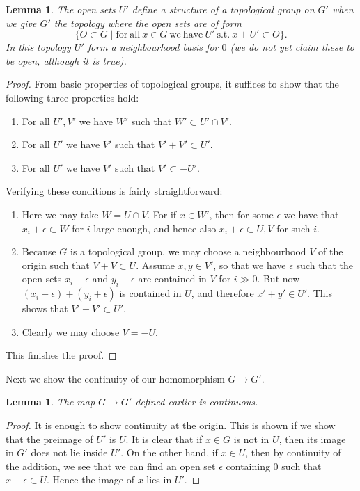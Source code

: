 \documentclass[12pt,a4paper,leqno]{article}
\theoremstyle{plain}
\newtheorem{lem}[theo]{Lemma}
\theoremstyle{definition}
\theoremstyle{remark}
\begin{document}
\begin{lem}\label{TopGroupFromNbhd}
The open sets $U'$ define a structure of a topological group on $G'$ when we give $G'$ the topology where the open sets are of form
\begin{equation*}
\{O \subset G \mid \mathrm{for \ all \ } x \in G \mathrm{\ we \ have \ } U' \mathrm{\ s.t. \ } x+U' \subset O \}.
\end{equation*}
In this topology $U'$ form a neighbourhood basis for $0$ (we do not yet claim these to be open, although it is true).
\end{lem}
\begin{proof}
From basic properties of topological groups, it suffices to show that the following three properties hold:
\begin{enumerate}
\item For all $U',V'$ we have $W'$ such that $W' \subset U' \cap V'$.
\item For all $U'$ we have $V'$ such that $V'+V' \subset U'$.
\item For all $U'$ we have $V'$ such that $V' \subset -U'$.
\end{enumerate}
Verifying these conditions is fairly straightforward:

\begin{enumerate}
\item Here we may take $W = U \cap V$. For if $x \in W'$, then for some $\epsilon$ we have that $x_i + \epsilon \subset W$ for $i$ large enough, and hence also $x_i + \epsilon \subset U,V$ for such $i$.

\item Because $G$ is a topological group, we may choose a neighbourhood $V$ of the origin such that $V+V \subset U$. Assume $x,y \in V'$, so that we have $\epsilon$ such that the open sets $x_i + \epsilon$ and $y_i + \epsilon$ are contained in $V$ for $i \gg 0$. But now $(x_i + \epsilon) + (y_i + \epsilon)$ is contained in $U$, and therefore $x' + y' \in U'$. This shows that $V'+V' \subset U'$.

\item Clearly we may choose $V = -U$. 
\end{enumerate}
This finishes the proof.
\end{proof}

Next we show the continuity of our homomorphism $G \to G'$.

\begin{lem}\label{SeqCont}
The map $G \to G'$ defined earlier is continuous.
\end{lem}
\begin{proof}
It is enough to show continuity at the origin. This is shown if we show that the preimage of $U'$ is $U$. It is clear that if $x \in G$ is not in $U$, then its image in $G'$ does not lie inside $U'$. On the other hand, if $x \in U$, then by continuity of the addition, we see that we can find an open set $\epsilon$ containing $0$ such that $x + \epsilon \subset U$. Hence the image of $x$ lies in $U'$.
\end{proof}
\end{document}
